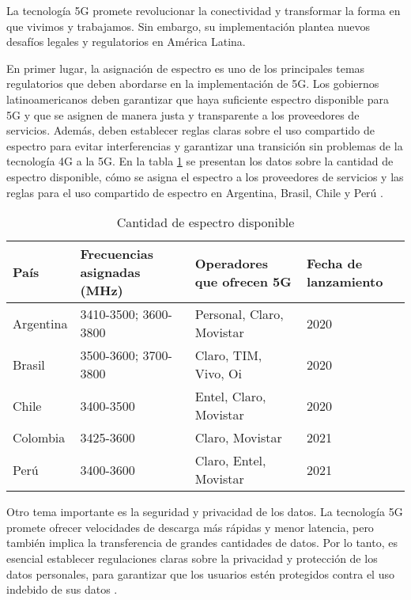 \documentclass[12pt]{article}
\begin{document}
            La tecnología 5G promete revolucionar la conectividad y transformar la forma en que vivimos y trabajamos. Sin embargo, su implementación plantea nuevos desafíos legales y regulatorios en América Latina. 

            En primer lugar, la asignación de espectro es uno de los principales temas regulatorios que deben abordarse en la implementación de 5G. Los gobiernos latinoamericanos deben garantizar que haya suficiente espectro disponible para 5G y que se asignen de manera justa y transparente a los proveedores de servicios. Además, deben establecer reglas claras sobre el uso compartido de espectro para evitar interferencias y garantizar una transición sin problemas de la tecnología 4G a la 5G. En la tabla \ref{tab:espectrodisponible} se presentan los datos sobre la cantidad de espectro disponible, cómo se asigna el espectro a los proveedores de servicios y las reglas para el uso compartido de espectro en Argentina, Brasil, Chile y Perú \cite{ramos2020consideraciones}. 

            \begin{table}[!h]
                \renewcommand{\tablename}{Tabla}
                \centering
                \caption{Cantidad de espectro disponible}
                \label{tab:espectrodisponible}
                \begin{tabular}{|p{3cm}|p{3cm}|p{3cm}|p{3cm}|}
                    \hline
                    \textbf{País} & \textbf{Frecuencias asignadas (MHz)} & \textbf{Operadores que ofrecen 5G} & \textbf{Fecha de lanzamiento} \\
                    \hline
                    Argentina & 3410-3500; 3600-3800 & Personal, Claro, Movistar & 2020 \\
                    \hline
                    Brasil & 3500-3600; 3700-3800 & Claro, TIM, Vivo, Oi & 2020 \\
                    \hline
                    Chile & 3400-3500 & Entel, Claro, Movistar & 2020 \\
                    \hline
                    Colombia & 3425-3600 & Claro, Movistar & 2021 \\
                    \hline
                    Perú & 3400-3600 & Claro, Entel, Movistar & 2021 \\
                    \hline
                \end{tabular}
            \end{table}
            
            Otro tema importante es la seguridad y privacidad de los datos. La tecnología 5G promete ofrecer velocidades de descarga más rápidas y menor latencia, pero también implica la transferencia de grandes cantidades de datos. Por lo tanto, es esencial establecer regulaciones claras sobre la privacidad y protección de los datos personales, para garantizar que los usuarios estén protegidos contra el uso indebido de sus datos \cite{garcia2018escenarios}.
            
\end{document}
